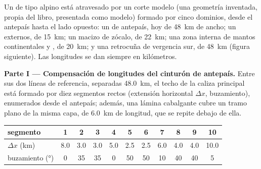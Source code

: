 \begin{problem}\label{pb:b2:alpine-orogen:1}
Un  de tipo alpino está atravesado por un corte modelo (una geometría inventada, propia del libro,
presentada como modelo) formado por cinco dominios, desde el antepaís hasta el lado opuesto:
un  de antepaís, hoy de \qty{48}{km} de ancho; un  externos, de \qty{15}{km};
un macizo de zócalo, de \qty{22}{km}; una zona interna de mantos continentales y , de
\qty{20}{km}; y una retrocuña de vergencia sur, de \qty{48}{km}
(figura siguiente). Las longitudes se dan siempre en kilómetros.

\begin{omfigure}
\centering
{}
\par{}
\end{omfigure}

\noindent\textbf{Parte I --- Compensación de longitudes del cinturón de antepaís.} Entre sus dos líneas
de referencia, separadas \qty{48.0}{km}, el techo de la caliza principal está formado por diez segmentos rectos
(extensión horizontal $\Delta x$, buzamiento), enumerados desde el antepaís; además, una lámina cabalgante
cubre un tramo plano de la misma capa, de \qty{6.0}{km} de longitud, que se repite debajo de ella.

\smallskip
\begin{center}\small
\begin{tabular}{l|cccccccccc}
segmento & 1 & 2 & 3 & 4 & 5 & 6 & 7 & 8 & 9 & 10\\ \hline
$\Delta x$ (\unit{km}) & 8.0 & 3.0 & 3.0 & 5.0 & 2.5 & 2.5 & 6.0 & 4.0 & 4.0 & 10.0\\
buzamiento (\unit{\degree}) & 0 & 35 & 35 & 0 & 50 & 50 & 10 & 40 & 40 & 5
\end{tabular}
\end{center}
\smallskip


\end{problem}
